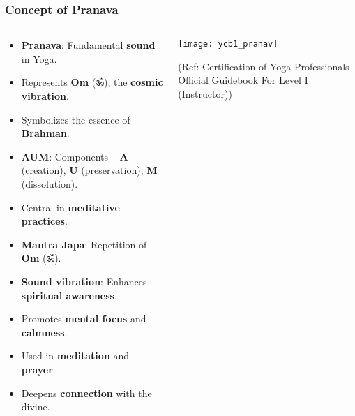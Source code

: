 \begin{frame}[fragile]\frametitle{Concept of Pranava}
\begin{columns}
    \begin{column}[T]{0.5\linewidth}
      \begin{itemize}
        \item \textbf{Pranava}: Fundamental \textbf{sound} in Yoga.
        \item Represents \textbf{Om} (ॐ), the \textbf{cosmic vibration}.
        \item Symbolizes the essence of \textbf{Brahman}.
        \item \textbf{AUM}: Components – \textbf{A} (creation), \textbf{U} (preservation), \textbf{M} (dissolution).
        \item Central in \textbf{meditative practices}.	  
        \item \textbf{Mantra Japa}: Repetition of \textbf{Om} (ॐ).
        \item \textbf{Sound vibration}: Enhances \textbf{spiritual awareness}.
        \item Promotes \textbf{mental focus} and \textbf{calmness}.
        \item Used in \textbf{meditation} and \textbf{prayer}.
        \item Deepens \textbf{connection} with the divine.
      \end{itemize}
    \end{column}
    \begin{column}[T]{0.5\linewidth}
        \begin{center}
        \texttt{[image: ycb1\_pranav]}

		{\tiny (Ref: Certification  of Yoga Professionals Official Guidebook For Level I (Instructor))}		
        \end{center}	
    \end{column}
\end{columns}
\end{frame}


